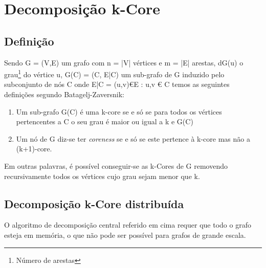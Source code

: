 \documentclass[a4paper,10pt]{report}
\begin{document}
\section*{Decomposição k-Core}


\subsection*{Definição}
Sendo G = (V,E) um grafo com n = |V| vértices e m = |E| arestas, dG(u) o grau\footnote{Número de arestas} do vértice u, G(C) = (C, E|C) um sub-grafo de G induzido pelo subconjunto de nós C onde E|C = {(u,v)€E : u,v € C} temos as seguintes definições segundo Batagelj-Zaversnik:

\begin{enumerate}
	\item Um sub-grafo G(C) é uma k-core se e só se para todos os vértices pertencentes a C o seu grau é maior ou igual a k e G(C)
	\item Um nó de G diz-se ter \textit{coreness} se e só se este pertence à k-core mas não a (k+1)-core.
\end{enumerate}


Em outras palavras, é possível conseguir-se as k-Cores de G removendo recursivamente todos os vértices cujo grau sejam menor que k.



\subsection*{Decomposição k-Core distribuída}
O algoritmo de decomposição central referido em cima requer que todo o grafo esteja em memória, o que não pode ser possível para grafos de grande escala.



\end{document}
